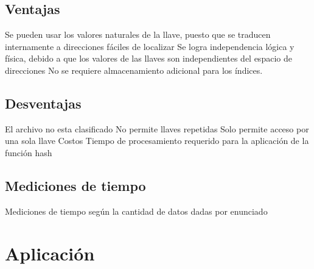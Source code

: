 \documentclass[letterpaper,openright,12pt]{report}
\begin{document}
\subsection{Ventajas}

Se pueden usar los valores naturales de la llave, puesto que se traducen
internamente a direcciones fáciles de localizar Se logra independencia
lógica y física, debido a que los valores de las llaves son
independientes del espacio de direcciones No se requiere almacenamiento
adicional para los índices.

\subsection{Desventajas}

El archivo no esta clasificado No permite llaves repetidas Solo permite
acceso por una sola llave Costos Tiempo de procesamiento requerido para
la aplicación de la función hash
\newpage

\subsection{Mediciones de tiempo}

Mediciones de tiempo según la cantidad de datos dadas por enunciado 
\newpage

\section{Aplicación}
\end{document}
